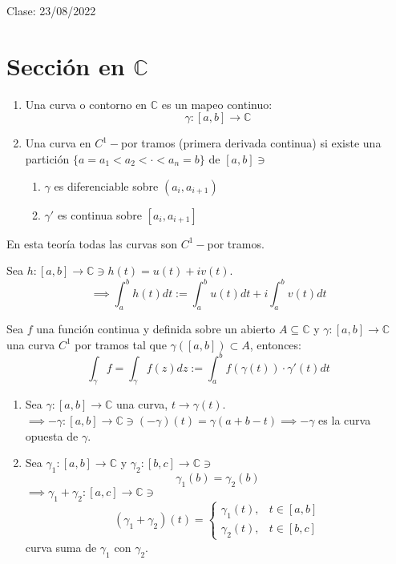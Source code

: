 Clase: 23/08/2022
\section{Sección en $\mathbb{C}$}

\begin{nota}
    \begin{enumerate}
        \item Una curva o contorno en $\mathbb{C}$ es un mapeo continuo: 
        $$\gamma:[a,b]\to\mathbb{C}$$
        \item Una curva en $C^1-$por tramos (primera derivada continua) si existe una partición $\{a=a_1<a_2<\cdot <a_n=b\}$ de $[a,b]\ni$
        \begin{enumerate}
            \item $\gamma$ es diferenciable sobre $(a_i,a_{i+1})$
            \item $\gamma'$ es continua sobre $[a_i,a_{i+1}]$
        \end{enumerate} 
    \end{enumerate}
    \begin{cajita}
        En esta teoría todas las curvas son $C^1-$por tramos.
    \end{cajita}
\end{nota}

\begin{definicion}
    Sea $h:[a,b]\to\mathbb{C}\ni h(t)=u(t)+iv(t)$.
    $$\implies \int_a^b h(t)dt := \int_a^b u(t)dt+i \int_a^bv(t)dt$$
\end{definicion}

\begin{definicion}
    Sea $f$ una función continua y definida sobre un abierto $A\subseteq \mathbb{C}$ y $\gamma:[a,b]\to \mathbb{C}$ una curva $C^1$ por tramos tal que $\gamma([a,b])\subset A$, entonces: 
    $$\int_\gamma f = \int_\gamma f(z)dz:= \int_a^b f(\gamma(t))\cdot \gamma'(t)dt$$
\end{definicion}


\begin{nota}
    \begin{enumerate}
        \item Sea $\gamma:[a,b]\to\mathbb{C}$ una curva, $t\to \gamma(t)$. $\implies -\gamma:[a,b]\to\mathbb{C}\ni (-\gamma)(t)=\gamma(a+b-t)\implies -\gamma$ es la curva opuesta de $\gamma$.
        \item Sea $\gamma_1:[a,b]\to\mathbb{C}$ y $\gamma_2:[b,c]\to\mathbb{C}\ni $
        $$\gamma_1(b)=\gamma_2(b)$$
        $\implies \gamma_1+\gamma_2:[a,c]\to\mathbb{C}\ni$
        $$(\gamma_1+\gamma_2)(t)=\begin{cases}
            \gamma_1(t), & t\in [a,b]\\
            \gamma_2(t), & t\in[b,c]
        \end{cases}$$
        curva suma de $\gamma_1$ con $\gamma_2$.
    \end{enumerate}
\end{nota}

